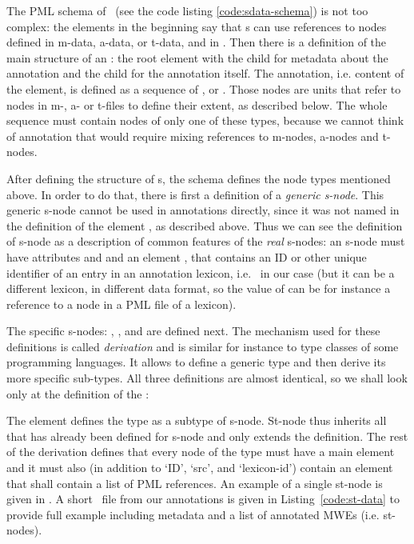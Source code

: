 The PML schema of \sdata\ (see the code listing \ref{code:sdata-schema}) is not too complex: the elements  in the beginning say that \sf{}s can use references to nodes defined in m-data, a-data, or t-data, and in \semlex. Then there is a definition of the main structure of an \sf: the root element  with the child  for metadata about the annotation and the child  for the annotation itself. The annotation, i.e. content of the  element, is defined as a sequence of , or . Those nodes are units that refer to nodes in m-, a- or t-files to define their extent, as described below. The whole sequence must contain nodes of only one of these types, because we cannot think of annotation that would require mixing references to m-nodes, a-nodes and t-nodes.

After defining the structure of \sf{}s, the schema defines the node types mentioned above. In order to do that, there is first a definition of a \emph{generic s-node}. This generic s-node cannot be used in annotations directly, since it was not named in the definition of the element , as described above. Thus we can see the definition of s-node as a description of common features of the \emph{real} s-nodes: an s-node must have attributes  and  and an element , that contains an ID or other unique identifier of an entry in an annotation lexicon, i.e. \semlex\ in our case (but it can be a different lexicon, in different data format, so the value of  can be for instance a reference to a node in a PML file of a lexicon). 

The specific s-nodes: , , and  are defined next. The mechanism used for these definitions is called \emph{derivation} and is similar for instance to type classes of some programming languages. It allows to define a generic type and then derive its more specific sub-types. All three definitions are almost identical, so we shall look only at the definition of the : 

The element  defines the type  as a subtype of {s-node}. St-node thus inherits all that has already been defined for s-node and only extends the definition. The rest of the derivation defines that every node of the type  must have a main element  and it must also (in addition to `ID', `src', and `lexicon-id') contain an element  that shall contain a list of PML references. An example of a single st-node is given in . A short \sdata\ file from our annotations is given in Listing~\ref{code:st-data} to provide full example including metadata and a list of annotated MWEs (i.e. st-nodes).

